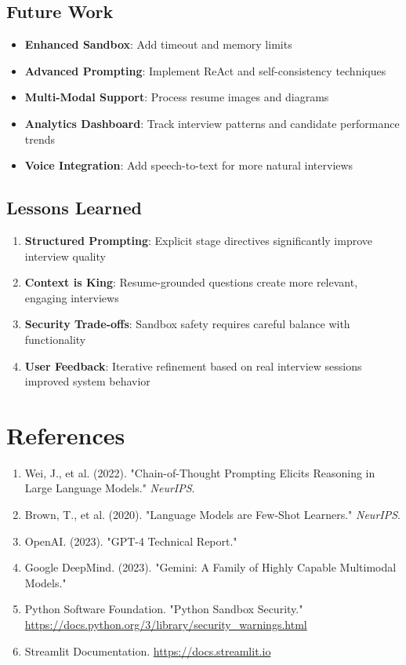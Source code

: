 \documentclass[12pt,a4paper]{article}
\begin{document}
\subsection{Future Work}

\begin{itemize}
    \item \textbf{Enhanced Sandbox}: Add timeout and memory limits
    \item \textbf{Advanced Prompting}: Implement ReAct and self-consistency techniques
    \item \textbf{Multi-Modal Support}: Process resume images and diagrams
    \item \textbf{Analytics Dashboard}: Track interview patterns and candidate performance trends
    \item \textbf{Voice Integration}: Add speech-to-text for more natural interviews
\end{itemize}

\subsection{Lessons Learned}

\begin{enumerate}
    \item \textbf{Structured Prompting}: Explicit stage directives significantly improve interview quality
    \item \textbf{Context is King}: Resume-grounded questions create more relevant, engaging interviews
    \item \textbf{Security Trade-offs}: Sandbox safety requires careful balance with functionality
    \item \textbf{User Feedback}: Iterative refinement based on real interview sessions improved system behavior
\end{enumerate}

\section{References}

\begin{enumerate}
    \item Wei, J., et al. (2022). "Chain-of-Thought Prompting Elicits Reasoning in Large Language Models." \textit{NeurIPS}.
    \item Brown, T., et al. (2020). "Language Models are Few-Shot Learners." \textit{NeurIPS}.
    \item OpenAI. (2023). "GPT-4 Technical Report."
    \item Google DeepMind. (2023). "Gemini: A Family of Highly Capable Multimodal Models."
    \item Python Software Foundation. "Python Sandbox Security." \url{https://docs.python.org/3/library/security\_warnings.html}
    \item Streamlit Documentation. \url{https://docs.streamlit.io}
\end{enumerate}
\end{document}
